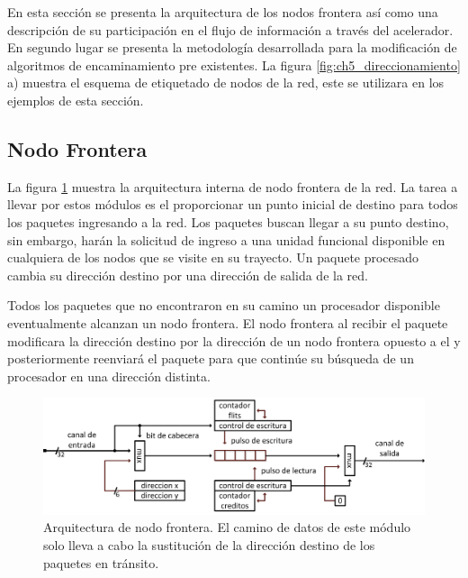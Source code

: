 En esta sección se presenta la arquitectura de los nodos frontera así como una descripción de su participación en el flujo de información a través del acelerador. En segundo lugar se presenta la metodología desarrollada para la modificación de algoritmos de encaminamiento pre existentes. La figura \ref{fig:ch5_direccionamiento} a) muestra el esquema de etiquetado de nodos de la red, este se utilizara en los ejemplos de esta sección.


\subsection{Nodo Frontera}
	\label{subsec:ch5_nodo_frontera}

La figura \ref{fig:ch5_nodo_frontera} muestra la arquitectura interna de nodo frontera de la red. La tarea a llevar por estos módulos es el proporcionar un punto inicial de destino para todos los paquetes ingresando a la red. Los paquetes buscan llegar a su punto destino, sin embargo, harán la solicitud de ingreso a una unidad funcional disponible en cualquiera de los nodos que se visite en su trayecto. Un paquete procesado cambia su dirección destino por una dirección de salida de la red.

Todos los paquetes que no encontraron en su camino un procesador disponible eventualmente alcanzan un nodo frontera. El nodo frontera al recibir el paquete modificara la dirección destino por la dirección de un nodo frontera opuesto a el y posteriormente reenviará el paquete para que continúe su búsqueda de un procesador en una dirección distinta. 

\begin{figure}
	\begin{center}
		\includegraphics[scale=0.7]{figures/ch5_nodo_frontera.png}
	\end{center}
	\caption
		{	
			Arquitectura de nodo frontera. El camino de datos de este módulo solo lleva a cabo la sustitución de la dirección destino de los paquetes en tránsito.
		}
	\label{fig:ch5_nodo_frontera}
\end{figure}

